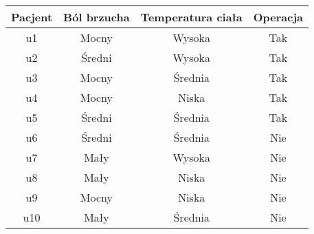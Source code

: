 \documentclass[12pt, letterpaper, titlepage]{article}
\begin{document}
\begin{center}

\begin{tabular}{ c | c  c  c }
\hline \hline
Pacjent & Ból brzucha & Temperatura ciała & Operacja \\
\hline
u1 & Mocny & Wysoka & Tak \\
u2 & Średni & Wysoka & Tak \\
u3 & Mocny & Średnia & Tak \\
u4 & Mocny & Niska & Tak \\
u5 & Średni & Średnia & Tak \\
u6 & Średni & Średnia & Nie \\
u7 & Mały & Wysoka & Nie \\
u8 & Mały & Niska & Nie \\
u9 & Mocny & Niska & Nie \\
u10 & Mały & Średnia & Nie \\
\hline \hline
\end{tabular}
\end{center}
\end{document}
